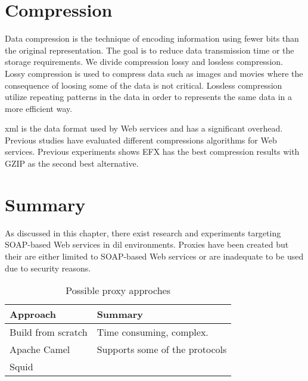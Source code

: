 

\section{Compression}

Data compression is the technique of encoding information using fewer bits than
the original representation. The goal is to reduce data transmission time or the
storage requirements. We divide compression lossy and lossless compression.
Lossy compression is used to compress data such as images and movies where the
consequence of loosing some of the data is not critical. Lossless compression
utilize repeating patterns in the  data in order to represents the same data in
a more efficient way.

\gls{xml} is the data format used by Web services and has a significant
overhead. Previous studies have evaluated different compressions algorithms for
Web services. Previous experiments shows EFX has the best compression results with
GZIP as the second best alternative\cite{johnsen-trude-compression-techniqes}.


\section{Summary}

As discussed in this chapter, there exist research and experiments targeting
SOAP-based Web services in \gls{dil} environments. Proxies have been created but
their are either limited to SOAP-based Web services or are inadequate to be used
due to security reasons.

\begin{table}
    \begin{tabular}{|l|l|}
    \hline
    \textbf{Approach}          & \textbf{Summary}     \\ \hline
    Build from scratch & Time consuming, complex.       \\ \hline
    Apache Camel      & Supports some of the protocols \\ \hline
    Squid      & \\ \hline
    \end{tabular}
    \caption {Possible proxy approches}
\end{table}
